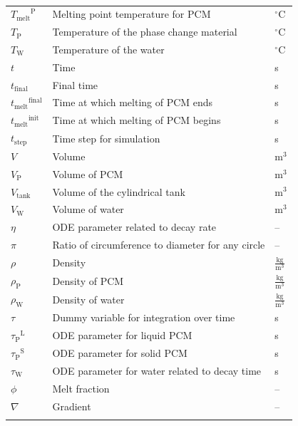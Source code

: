 \documentclass[12pt]{article}
\begin{document}
\begin{longtabu}{l X[l] l}
\\
${{T_{\text{melt}}}^{\text{P}}}$ & Melting point temperature for PCM & ${}^{\circ}$C
\\
${T_{\text{P}}}$ & Temperature of the phase change material & ${}^{\circ}$C
\\
${T_{\text{W}}}$ & Temperature of the water & ${}^{\circ}$C
\\
$t$ & Time & s
\\
${t_{\text{final}}}$ & Final time & s
\\
${{t_{\text{melt}}}^{\text{final}}}$ & Time at which melting of PCM ends & s
\\
${{t_{\text{melt}}}^{\text{init}}}$ & Time at which melting of PCM begins & s
\\
${t_{\text{step}}}$ & Time step for simulation & s
\\
$V$ & Volume & $\text{m}^{3}$
\\
${V_{\text{P}}}$ & Volume of PCM & $\text{m}^{3}$
\\
${V_{\text{tank}}}$ & Volume of the cylindrical tank & $\text{m}^{3}$
\\
${V_{\text{W}}}$ & Volume of water & $\text{m}^{3}$
\\
$η$ & ODE parameter related to decay rate & --
\\
$π$ & Ratio of circumference to diameter for any circle & --
\\
$ρ$ & Density & $\frac{\text{kg}}{\text{m}^{3}}$
\\
${ρ_{\text{P}}}$ & Density of PCM & $\frac{\text{kg}}{\text{m}^{3}}$
\\
${ρ_{\text{W}}}$ & Density of water & $\frac{\text{kg}}{\text{m}^{3}}$
\\
$τ$ & Dummy variable for integration over time & s
\\
${{τ_{\text{P}}}^{\text{L}}}$ & ODE parameter for liquid PCM & s
\\
${{τ_{\text{P}}}^{\text{S}}}$ & ODE parameter for solid PCM & s
\\
${τ_{\text{W}}}$ & ODE parameter for water related to decay time & s
\\
$ϕ$ & Melt fraction & --
\\
$∇$ & Gradient & --
\\
\bottomrule
\caption{}
\label{Table:ToS}
\end{longtabu}
\end{document}
